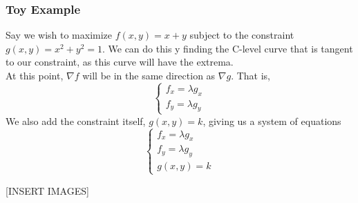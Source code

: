 \subsubsection{Toy Example}
\noindent
Say we wish to maximize $f(x,y) = x+y$ subject to the constraint $g(x,y) = x^2 + y^2 = 1$. We can do this y finding the C-level curve that is tangent to our constraint, as this curve will have the extrema.\\
At this point, $\nabla f$ will be in the same direction as $\nabla g$. That is,
\begin{equation*}
	\begin{cases} 
		f_x = \lambda g_x \\ 
		f_y = \lambda g_y
	\end{cases}	
\end{equation*}
We also add the constraint itself, $g(x,y) = k$, giving us a system of equations
\begin{equation*}
	\begin{cases}
		f_x = \lambda g_x \\ 
		f_y = \lambda g_y \\ 
		g(x,y)=k 
	\end{cases}	
\end{equation*}

[INSERT IMAGES]